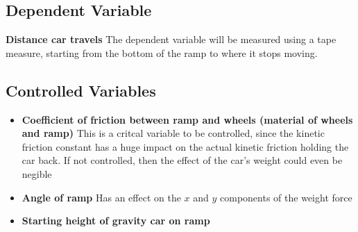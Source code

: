\documentclass[12pt]{article}
\begin{document}
\subsection{Dependent Variable} \textbf{Distance car travels} The dependent variable will be measured using a tape measure, starting from the bottom of the ramp to where it stops moving.

\subsection{Controlled Variables}
\begin{itemize}
    \item \textbf{Coefficient of friction between ramp and wheels (material of wheels and ramp)} This is a critcal variable to be controlled, since the kinetic friction constant has a huge impact on the actual kinetic friction holding the car back. If not controlled, then the effect of the car's weight could even be negible
    \item \textbf{Angle of ramp} Has an effect on the \(x\) and \(y\) components of the weight force
    \item \textbf{Starting height of gravity car on ramp} 
\end{itemize}








\end{document}
